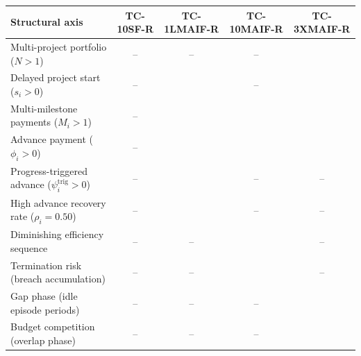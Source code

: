 \documentclass[10pt,border=6pt]{standalone}
\newcommand{\tabfont}{\fontsize{8.5}{10.5}\selectfont}
\newcommand{\yes}{\ding{51}}
\newcommand{\no}{--}
\begin{document}
\begin{minipage}{170mm}
\tabfont
\setlength{\tabcolsep}{4pt}
\renewcommand{\arraystretch}{1.15}
\begin{tabularx}{\linewidth}{>{\raggedright\arraybackslash}X cccc}
\toprule
\textbf{Structural axis} & \textbf{TC-10SF-R} & \textbf{TC-1LMAIF-R} & \textbf{TC-10MAIF-R} & \textbf{TC-3XMAIF-R} \\
\midrule
Multi-project portfolio ($N > 1$)                  & \no  & \no  & \no  & \yes \\
Delayed project start ($s_i > 0$)                  & \no  & \yes & \no  & \yes \\
Multi-milestone payments ($M_i > 1$)               & \no  & \yes & \yes & \yes \\
Advance payment ($\phi_i > 0$)                     & \no  & \yes & \yes & \yes \\
Progress-triggered advance ($\psi^{\mathrm{trig}}_i > 0$) & \no & \yes & \no & \no \\
High advance recovery rate ($\rho_i = 0.50$)       & \no  & \yes & \no  & \no  \\
Diminishing efficiency sequence                    & \no  & \no  & \yes & \no  \\
Termination risk (breach accumulation)             & \no  & \no  & \yes & \no  \\
Gap phase (idle episode periods)                   & \no  & \no  & \no  & \yes \\
Budget competition (overlap phase)                 & \no  & \no  & \no  & \yes \\
\bottomrule
\end{tabularx}
\end{minipage}
\end{document}
